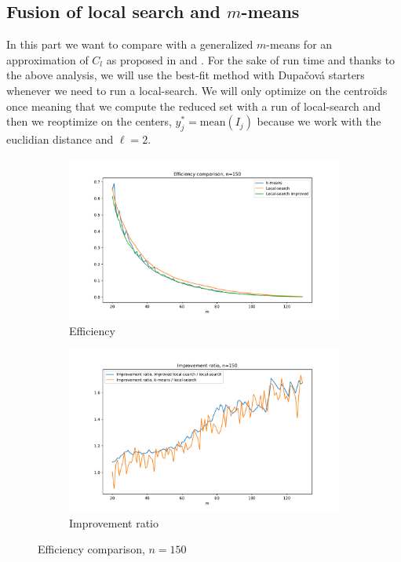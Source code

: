 \documentclass{amsart}
\begin{document}
\subsection{Fusion of local search and $m$-means}
In this part we want to compare   with a generalized $m$-means for an approximation of $C_l$ as proposed in  and . For the sake of run time and thanks to the above analysis, we will use the best-fit method with Dupačová starters whenever we need to run a local-search. We will only optimize on the centroïds once meaning that we compute the reduced set with a run of local-search and then we reoptimize on the centers, $y_j^*=\text{mean}\left(I_j\right)$ because we work with the euclidian distance and $\ell=2$.


\begin{figure}[ht]
    \centering
    \begin{subfigure}[b]{0.495\textwidth}
        \centering
        \includegraphics[width=1.1\textwidth]{plots/effiency cl.pdf}
        \caption{Efficiency}
    \end{subfigure}
    \hfill
    \begin{subfigure}[b]{0.495\textwidth}
        \centering
        \includegraphics[width=1.1\textwidth]{plots/efficiency ratio cl.pdf}
        \caption{Improvement ratio}
    \end{subfigure}
    \caption{Efficiency comparison, $n=150$}
    \label{cl }
\end{figure}
\end{document}
